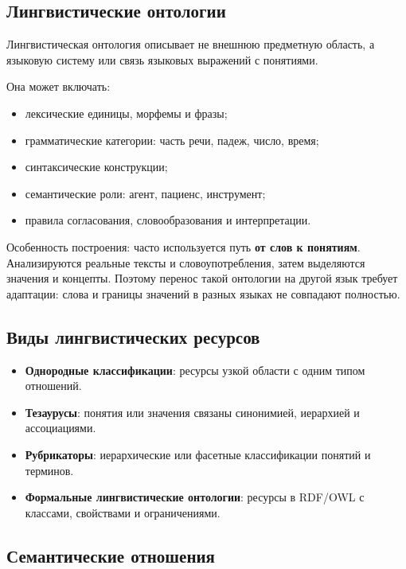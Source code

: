 \subsection*{Лингвистические онтологии}

Лингвистическая онтология описывает не внешнюю предметную область, а языковую систему или связь языковых выражений с понятиями.

Она может включать:
\begin{itemize}
    \item лексические единицы, морфемы и фразы;
    \item грамматические категории: часть речи, падеж, число, время;
    \item синтаксические конструкции;
    \item семантические роли: агент, пациенс, инструмент;
    \item правила согласования, словообразования и интерпретации.
\end{itemize}

Особенность построения: часто используется путь \textbf{от слов к понятиям}. Анализируются реальные тексты и словоупотребления, затем выделяются значения и концепты. Поэтому перенос такой онтологии на другой язык требует адаптации: слова и границы значений в разных языках не совпадают полностью.

\subsection*{Виды лингвистических ресурсов}

\begin{itemize}
    \item \textbf{Однородные классификации}: ресурсы узкой области с одним типом отношений.
    \item \textbf{Тезаурусы}: понятия или значения связаны синонимией, иерархией и ассоциациями.
    \item \textbf{Рубрикаторы}: иерархические или фасетные классификации понятий и терминов.
    \item \textbf{Формальные лингвистические онтологии}: ресурсы в RDF/OWL с классами, свойствами и ограничениями.
\end{itemize}

\subsection*{Семантические отношения}

